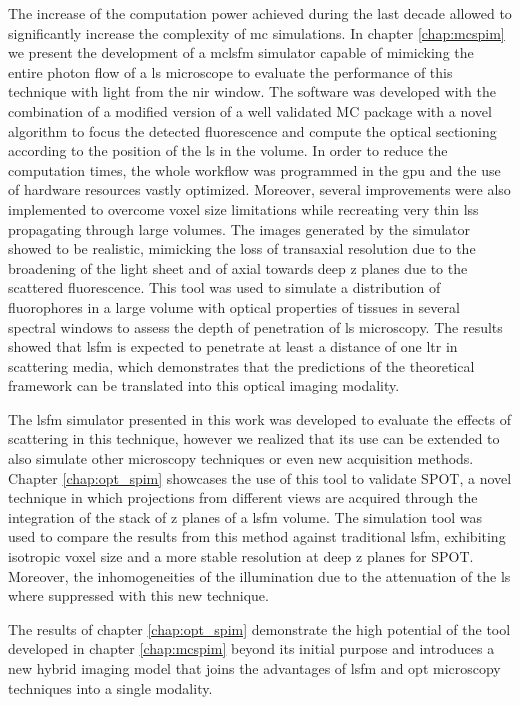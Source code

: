 The increase of the computation power achieved during the last decade allowed to significantly increase the complexity of \gls{mc} simulations. In chapter \ref{chap:mcspim}  we present the development of a \gls{mclsfm} simulator capable of mimicking the entire photon flow of a \gls{ls} microscope to evaluate the performance of this technique with light from the \gls{nir} window. The software was developed with the combination of a modified version of a well validated MC package \cite{Fang2009} with a novel algorithm to focus the detected fluorescence and compute the optical sectioning according to the position of the \gls{ls} in the volume. In order to reduce the computation times, the whole workflow was programmed in the \gls{gpu} and the use of hardware resources vastly optimized. Moreover, several improvements were also implemented to overcome voxel size limitations while recreating very thin \gls{ls}s propagating through large volumes. The images generated by the simulator showed to be realistic, mimicking the loss of transaxial resolution due to the broadening of the light sheet and of axial towards deep z planes due to the scattered fluorescence. This tool was used to simulate a distribution of fluorophores in a large volume with optical properties of tissues in several spectral windows to assess the depth of penetration of \gls{ls} microscopy. The results showed that \gls{lsfm} is expected to penetrate at least a distance of one \gls{ltr} in scattering media, which demonstrates that the predictions of the theoretical framework can be translated into this optical imaging modality. 

The \gls{lsfm} simulator presented in this work was developed to evaluate the effects of scattering in this technique, however we realized that its use can be extended to also simulate other microscopy techniques or even new acquisition methods. Chapter \ref{chap:opt_spim} showcases the use of this tool to validate SPOT, a novel technique in which projections from different views are acquired through the integration of the stack of z planes of a \gls{lsfm} volume. The simulation tool was used to compare the results from this method against traditional \gls{lsfm}, exhibiting isotropic voxel size and a more stable resolution at deep z planes for SPOT. Moreover, the inhomogeneities of the illumination due to the attenuation of the \gls{ls} where suppressed with this new technique. 

The results of chapter \ref{chap:opt_spim} demonstrate the high potential of the tool developed in chapter \ref{chap:mcspim} beyond its initial purpose and introduces a new hybrid imaging model that joins the advantages of \gls{lsfm} and \gls{opt} microscopy techniques into a single modality.

